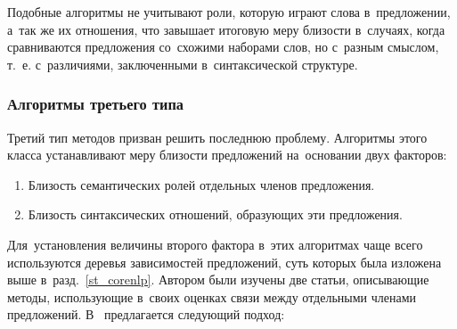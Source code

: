 Подобные алгоритмы не учитывают роли, которую играют слова в~предложении,
а~так же их отношения, что завышает итоговую меру близости в~случаях,
когда сравниваются предложения со~схожими наборами слов, но с~разным смыслом,
т.~е. с~различиями, заключенными в~синтаксической структуре.

\subsubsection{Алгоритмы третьего типа}
\label{sec:third_type_algorithm}
Третий тип методов призван решить последнюю проблему. 
Алгоритмы этого класса устанавливают меру близости предложений на~основании двух факторов:

\begin{enumerate}

\item{
Близость семантических ролей отдельных членов предложения.
}

\item{
Близость синтаксических отношений, образующих эти предложения.
}

\end{enumerate}

Для~установления величины второго фактора в~этих алгоритмах чаще всего используются
деревья зависимостей предложений, суть которых была изложена выше в~разд.~\ref{st_corenlp}.
Автором были изучены две статьи, описывающие методы, 
использующие в~своих оценках связи между отдельными членами предложений.
В~\cite{weightedDep} предлагается следующий подход:


